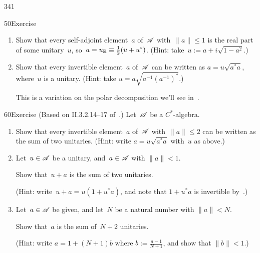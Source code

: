 \begin{parsec}{341}
\begin{point}{50}{Exercise}
\begin{enumerate}
Show that a normal element~$a$ of~$\scrA$ is unitary
        iff $\Real{a}^2 + \Imag{a}^2 = 1$.
\item
Show that every self-adjoint element~$a$ of~$\scrA$
with~$\|a\|\leq 1$
is the real part of some unitary~$u$, 
        so~$a=u_{\mathbb{R}}\equiv \frac{1}{2}(u+u^*)$.
(Hint:
        take~$u := a + i\sqrt{1-a^2}$.)
\item
Show that every invertible element~$a$ of~$\scrA$ can be written
as $a=u\sqrt{a^*a}$,
where~$u$ is a unitary.
(Hint: take $u=a\sqrt{a^{-1}(a^{-1})^*}$.)

This is a variation on the polar decomposition
we'll see in~.
\end{enumerate}
\spacingfix%
\end{point}%
\begin{point}{60}{Exercise}
(Based on II.3.2.14--17 of~\cite{blackadar2006operator}.)
Let~$\scrA$ be a $C^*$-algebra.
\begin{enumerate}
\item
Show that every invertible element~$a$ of~$\scrA$
with~$\|a\|\leq 2$ can be written
as the sum of two unitaries.
(Hint: write $a=u\sqrt{a^*a}$ with~$u$ as above.)
\item
Let~$u\in \mathscr{A}$ be a unitary, and~$a\in\mathscr{A}$ with $\|a\|< 1$.

Show that~$u+a$ is the sum of two unitaries.

(Hint: write~$u+a=u(1+u^*a)$, and
        note that $1+u^*a$ is invertible by~.)
\item
Let~$a\in \mathscr{A}$ be given,
and let~$N$ be a natural number with $\|a\| < N$.

Show that~$a$ is the sum of~$N+2$ unitaries. 

(Hint: write $a=1+(N+1)b$ where $b:=\frac{a-1}{N+1}$,
and show that $\|b\|< 1$.)


\end{enumerate}
\end{point}
\end{parsec}
